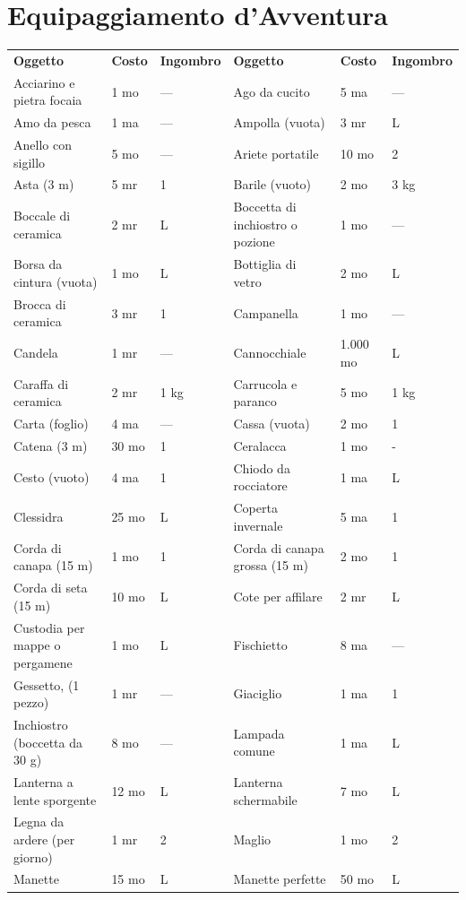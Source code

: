 \documentclass[a4paper,11pt,twoside,openany]{book}
\begin{document}
{\section{Equipaggiamento d'Avventura}\label{Equipaggiamento}

\label{equipaggiamento-davventura}


\begin{longtable}{|L{4cm} |k{1.5cm} |k{1.5cm}|L{5cm} |k{1.5cm} |k{1.5cm}|}
\tabcolsep=0.11cm
\textbf{Oggetto}&	\textbf{Costo}	& \textbf{Ingombro}&\textbf{Oggetto}&	\textbf{Costo}	&\textbf{Ingombro}\\
Acciarino e pietra focaia	&1 mo&	— & 	Ago da cucito&	5 ma&	—\\
Amo da pesca&	1 ma&	—&	Ampolla (vuota)&	3 mr&	L\\
Anello con sigillo&	5 mo&	—&	Ariete portatile&	10 mo	&2\\
Asta (3 m)&	5 mr&	1&	Barile (vuoto)&	2 mo&	3 kg\\
Boccale di ceramica	&2 mr&	L &	Boccetta di inchiostro o pozione&	1 mo&	—\\
Borsa da cintura (vuota)&	1 mo&	L&	Bottiglia di vetro&	2 mo& L\\
Brocca di ceramica&	3 mr&	1&	Campanella&	1 mo&	—\\
Candela&	1 mr&	—&	Cannocchiale&	1.000 mo&	L\\
Caraffa di ceramica&	2 mr&	1 kg&	Carrucola e paranco&	5 mo&	1 kg\\
Carta (foglio)&	4 ma&	—&	Cassa (vuota)&	2 mo& 1\\
Catena (3 m)&	30 mo&	1&	Ceralacca&	1 mo&	- \\
Cesto (vuoto)&	4 ma&	1&	Chiodo da rocciatore&	1 ma& L\\
Clessidra&	25 mo	&L&	Coperta invernale&	5 ma&1\\
Corda di canapa (15 m)	&1 mo&	1&	Corda di canapa grossa (15 m)&2 mo&1\\
Corda di seta (15 m)&10 mo&L&	Cote per affilare&2 mr&L\\
Custodia per mappe o pergamene&1 mo&L&	Fischietto&8 ma&—\\
Gessetto, (1 pezzo)&1 mr&—&	Giaciglio&1 ma&1\\
Inchiostro (boccetta da 30 g)&8 mo&—&	Lampada comune&1 ma&L\\
Lanterna a lente sporgente&12 mo&L&	Lanterna schermabile&7 mo&L\\
Legna da ardere (per giorno)&1 mr&2&	Maglio&1 mo&2\\
Manette&15 mo&L&	Manette perfette&50 mo&L\\

\end{longtable}}
\end{document}
